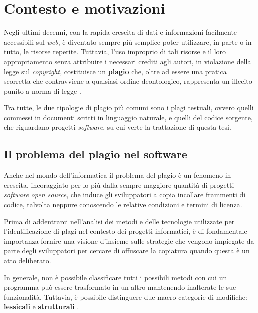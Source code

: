 \chapter{Contesto e motivazioni}
\label{chapter:context-and-motivations}

Negli ultimi decenni, con la rapida crescita di dati e informazioni facilmente accessibili sul \textit{web}, è diventato sempre più semplice poter utilizzare, in parte o in tutto, le risorse reperite.
%
Tuttavia, l'uso improprio di tali risorse e il loro appropriamento senza attribuire i necessari crediti agli autori, in violazione della legge sul \textit{copyright}, costituisce un \textbf{plagio} \cite{britannica} che, oltre ad essere una pratica scorretta che contravviene a qualsiasi ordine deontologico, rappresenta un illecito punito a norma di legge \cite{copyright-law-italia}.

Tra tutte, le due tipologie di plagio più comuni sono i plagi testuali, ovvero quelli commessi in documenti scritti in linguaggio naturale, e quelli del codice sorgente, che riguardano progetti \textit{software}, su cui verte la trattazione di questa tesi.

\section{Il problema del plagio nel software}
Anche nel mondo dell'informatica il problema del plagio è un fenomeno in crescita, incoraggiato per lo più dalla sempre maggiore quantità di progetti \textit{software} \textit{open source}, che induce gli sviluppatori a copia incollare frammenti di codice, talvolta neppure conoscendo le relative condizioni e termini di licenza.

Prima di addentrarci nell'analisi dei metodi e delle tecnologie utilizzate per l'identificazione di plagi nel contesto dei progetti informatici, è di fondamentale importanza fornire una visione d'insieme sulle strategie che vengono impiegate da parte degli sviluppatori per cercare di offuscare la copiatura quando questa è un atto deliberato.

In generale, non è possibile classificare tutti i possibili metodi con cui un programma può essere trasformato in un altro mantenendo inalterate le sue funzionalità.
%
Tuttavia, è possibile distinguere due macro categorie di modifiche: \textbf{lessicali} e \textbf{strutturali} \cite{joy-99}.

